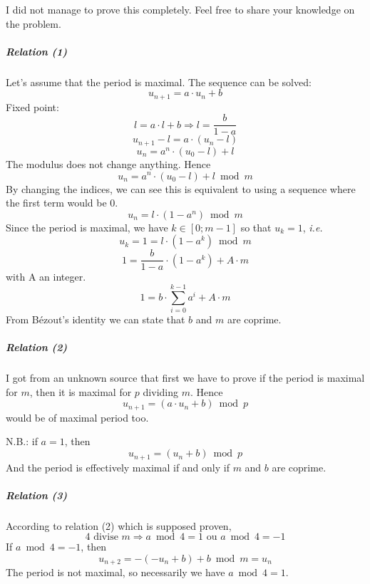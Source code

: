 \documentclass[10pt,a4paper]{article}
\def\ie{\textsl{i.e.}\xspace}
\begin{document}
I did not manage to prove this completely. Feel free to share your knowledge on
the problem.

\subparagraph{Relation (1)}

Let's assume that the period is maximal. The sequence can be solved:
\[
u_{n+1} = a \cdot u_n + b
\]
Fixed point:
\[
l = a \cdot l + b \Rightarrow l = \frac{b}{1-a}
\]
\[
u_{n+1} - l = a \cdot (u_n - l)
\]
\[
u_n = a^n \cdot (u_0 - l) + l
\]
The modulus does not change anything. Hence
\[
\boxed{ u_n = a^n \cdot (u_0 - l) + l \bmod m }
\]
By changing the indices, we can see this is equivalent to using a sequence where
the first term would be 0.
\[
u_n =  l \cdot (1 - a^n) \bmod m
\]
Since the period is maximal, we have $k \in [0;m-1]$ so that  $u_k = 1$, \ie
\[
u_k = 1 = l \cdot (1 - a^k) \bmod m
\]
\[
1 = \frac{b}{1-a} \cdot (1 - a^k) + A\cdot m
\]
with A an integer.
\[
\boxed{ 1 = b \cdot \sum_{i=0}^{k-1} a^i + A\cdot m }
\]
From Bézout's identity we can state that $b$ and $m$ are coprime.

\subparagraph{Relation (2)}
I got from an unknown source that first we have to prove if the period is
maximal for $m$, then it is maximal for $p$ dividing $m$. Hence
\[
u_{n+1} = (a \cdot u_n + b) \bmod p
\]
would be of maximal period too.

N.B.: if $a=1$, then
\[
u_{n+1} = (u_n + b) \bmod p
\]
And the period is effectively maximal if and only if $m$ and $b$ are coprime.

\subparagraph{Relation (3)}
According to relation (2) which is supposed proven,
\[
4 \text{ divise } m \Rightarrow a \bmod 4 = 1 \text{ ou } a \bmod 4 = -1
\]
If $a \bmod 4 = -1$, then
\[
u_{n+2} = -(-u_n + b) + b \bmod m = u_n
\]
The period is not maximal, so necessarily we have $a \bmod 4 = 1$.


\end{document}
